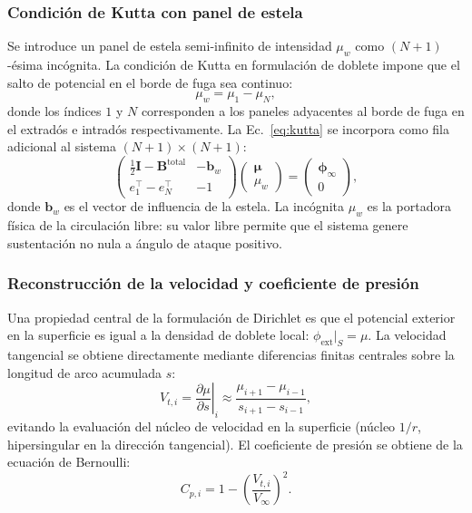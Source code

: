 \documentclass[twocolumn]{article}
\begin{document}
\subsubsection{Condición de Kutta con panel de estela}

Se introduce un panel de estela semi-infinito de intensidad $\mu_w$
como $(N+1)$-ésima incógnita. La condición de Kutta en
formulación de doblete impone que el salto de potencial en el borde
de fuga sea continuo:
\begin{equation}
  \mu_w = \mu_1 - \mu_N,
  \label{eq:kutta}
\end{equation}
donde los índices $1$ y $N$ corresponden a los paneles adyacentes al
borde de fuga en el extradós e intradós respectivamente.
La Ec.~\eqref{eq:kutta} se incorpora como fila adicional al sistema
$(N+1)\times(N+1)$:
\begin{equation}
  \begin{pmatrix}
    \frac{1}{2}\mathbf{I} - \mathbf{B}^\text{total} & -\mathbf{b}_w \\
    e_1^\top - e_N^\top & -1
  \end{pmatrix}
  \begin{pmatrix} \boldsymbol{\mu} \\ \mu_w \end{pmatrix}
  =
  \begin{pmatrix} \boldsymbol{\phi}_\infty \\ 0 \end{pmatrix},
  \label{eq:system}
\end{equation}
donde $\mathbf{b}_w$ es el vector de influencia de la estela.
La incógnita $\mu_w$ es la portadora física de la circulación libre:
su valor libre permite que el sistema genere sustentación no nula a
ángulo de ataque positivo.

\subsubsection{Reconstrucción de la velocidad y coeficiente de presión}

Una propiedad central de la formulación de Dirichlet es que el potencial
exterior en la superficie es igual a la densidad de doblete local:
$\phi_\text{ext}|_S = \mu$. La velocidad tangencial se obtiene
directamente mediante diferencias finitas centrales sobre la longitud
de arco acumulada $s$:
\begin{equation}
  V_{t,i} = \left.\frac{\partial\mu}{\partial s}\right|_i
  \approx \frac{\mu_{i+1} - \mu_{i-1}}{s_{i+1} - s_{i-1}},
  \label{eq:Vt}
\end{equation}
evitando la evaluación del núcleo de velocidad en la superficie (núcleo
$1/r$, hipersingular en la dirección tangencial). El coeficiente de
presión se obtiene de la ecuación de Bernoulli:
\begin{equation}
  C_{p,i} = 1 - \left(\frac{V_{t,i}}{V_\infty}\right)^2.
  \label{eq:cp}
\end{equation}
\end{document}
